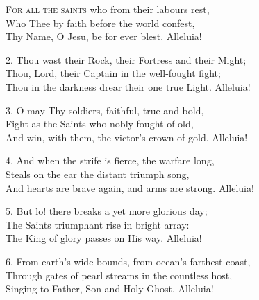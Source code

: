 
\lettrine{F}{or all the saints} who from their labours rest,\\
Who Thee by faith before the world confest,\\
Thy Name, O Jesu, be for ever blest. Alleluia!


\vskip6pt
\hskip-3pt 2. Thou wast their Rock, their Fortress and their Might;\\
Thou, Lord, their Captain in the well-fought fight;\\
Thou in the darkness drear their one true Light. Alleluia!


\vskip6pt
\hskip-3pt 3. O may Thy soldiers, faithful, true and bold,\\
Fight as the Saints who nobly fought of old,\\
And win, with them, the victor's crown of gold. Alleluia!



\vskip6pt
\hskip-3pt 4. And when the strife is fierce, the warfare long,\\
Steals on the ear the distant triumph song,\\
And hearts are brave again, and arms are strong.  Alleluia!

\vskip6pt
\hskip-3pt 5. But lo!  there breaks a yet more glorious day;\\
The Saints triumphant rise in bright array:\\
The King of glory passes on His way.  Alleluia!

\vskip6pt
\hskip-3pt 6. From earth's wide bounds, from ocean's farthest coast,\\
Through gates of pearl streams in the countless host,\\
Singing to Father, Son and Holy Ghost.  Alleluia!

\medskip


